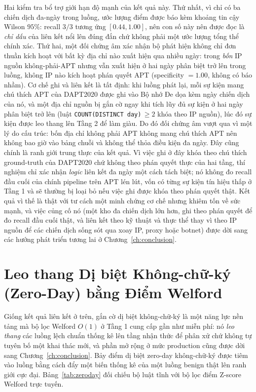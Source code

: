 Hai kiểm tra bổ trợ giới hạn độ mạnh của kết quả này. Thứ nhất, vì chỉ có ba chiến dịch đa-ngày trong luồng, ước lượng điểm được báo kèm khoảng tin cậy Wilson $95\%$: recall $3/3$ tương ứng $[0.44, 1.00]$, nên con số này nên được đọc là \emph{chỉ dấu} của liên kết nổi lên đúng đắn chứ không phải một ước lượng tổng thể chính xác. Thứ hai, một đối chứng âm xác nhận bộ phát hiện không chỉ đơn thuần kích hoạt với bất kỳ địa chỉ nào xuất hiện qua nhiều ngày: trong \emph{bốn} IP nguồn không-phải-APT nhưng vẫn xuất hiện ở hai ngày phân biệt trở lên trong luồng, không IP nào kích hoạt phán quyết APT (specificity $=1.00$, không có báo nhầm). Cơ chế ghi và liên kết là tất định: khi luồng phát lại, mỗi sự kiện mang chú thích APT của DAPT2020 được ghi vào Bộ nhớ Đe dọa kèm ngày chiến dịch của nó, và một địa chỉ nguồn bị gắn cờ ngay khi tích lũy đủ sự kiện ở hai ngày phân biệt trở lên (luật \texttt{COUNT(DISTINCT day)}$\,\ge 2$ khóa theo IP nguồn), lúc đó sự kiện được leo thang lên Tầng 2 để làm giàu. Do đó đối chứng âm vượt qua vì một lý do cấu trúc: bốn địa chỉ không phải APT không mang chú thích APT nên không bao giờ vào bảng chuỗi và không thể thỏa điều kiện đa ngày. Đây cũng chính là ranh giới trung thực của kết quả. Vì việc ghi ở đây khóa theo chú thích ground-truth của DAPT2020 chứ không theo phán quyết thực của hai tầng, thí nghiệm chỉ xác nhận \emph{logic} liên kết đa ngày một cách tách biệt; nó không đo recall đầu cuối của chính pipeline trên APT lén lút, vốn có từng sự kiện tín hiệu thấp ở Tầng 1 và sẽ thường bị loại bỏ nếu việc ghi được khóa theo phán quyết thật. Kết quả vì thế là thật với tư cách một minh chứng cơ chế nhưng khiêm tốn về sức mạnh, và việc củng cố nó (một kho đa chiến dịch lớn hơn, ghi theo phán quyết để đo recall đầu cuối thật, và liên kết theo kỹ thuật và thực thể thay vì theo IP nguồn để các chiến dịch sống sót qua xoay IP, proxy hoặc botnet) được dời sang các hướng phát triển tương lai ở Chương~\ref{ch:conclusion}.

\section{Leo thang Dị biệt Không-chữ-ký (Zero-Day) bằng Điểm Welford}
Giống kết quả liên kết ở trên, gắn cờ dị biệt không-chữ-ký là một năng lực nền tảng mà bộ lọc Welford $O(1)$ ở Tầng 1 cung cấp gần như miễn phí: nó \emph{leo thang} các luồng lệch chuẩn thống kê lên tầng nhận thức để phân xử chứ không tự tuyên bố một khai thác mới, và phần mở rộng ở mức production cũng được dời sang Chương~\ref{ch:conclusion}. Bảy điểm dị biệt zero-day không-chữ-ký được tiêm vào luồng bằng cách đẩy một biến thống kê của một luồng benign thật lên ranh giới cực đại. Bảng~\ref{tab:zeroday} đối chiếu bộ luật tĩnh với bộ lọc điểm Z-score Welford trực tuyến.

